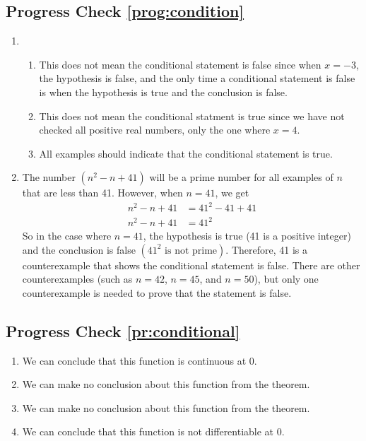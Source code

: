 \subsection*{Progress Check \ref{prog:condition}}
\begin{enumerate}
  \item \begin{enumerate}
      \item  This does not mean the conditional statement is false since when $x = -3$, the hypothesis is false, and the only time a conditional statement is false is when the hypothesis is true and the conclusion is false.
      \item This does not mean the conditional statment is true since we have not checked all positive real numbers, only the one where $x = 4$.
      \item All examples should indicate that the conditional statement is true.
  \end{enumerate}
  \item The number $\left( n^2 - n + 41 \right)$ will be a prime number for all examples of $n$ that are less than 41.  However, when $n = 41$, we get
\begin{align*}
  n^2  - n + 41 &= 41^2  - 41 + 41 \\ 
  n^2  - n + 41 &= 41^2 
\end{align*}
So in the case where  $n = 41$, the hypothesis is true  (41 is a positive integer) and the conclusion is false $\left( {41^2 \text{ is not prime}} \right)$.  Therefore, 41 is a counterexample that shows the conditional statement is false.  There are other counterexamples (such as $n = 42$, $n = 45$, and  $n = 50$), but only one counterexample is needed to prove that the statement is false.
\end{enumerate}



\subsection*{Progress Check \ref{pr:conditional}}
\begin{enumerate}
\item We can conclude that this function is continuous at 0.
\item We can make no conclusion about this function from the theorem.
\item We can make no conclusion about this function from the theorem.
\item We can conclude that this function is not differentiable at 0.
\end{enumerate}



